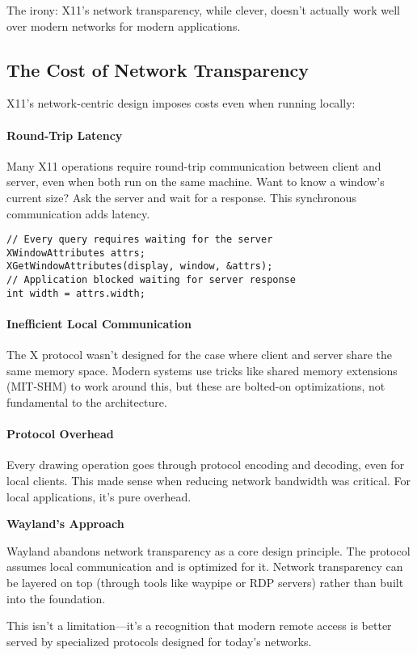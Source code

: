 The irony: X11's network transparency, while clever, doesn't actually work well over modern networks for modern applications.

\subsection{The Cost of Network Transparency}

X11's network-centric design imposes costs even when running locally:

\paragraph{Round-Trip Latency}
Many X11 operations require round-trip communication between client and server, even when both run on the same machine. Want to know a window's current size? Ask the server and wait for a response. This synchronous communication adds latency.

\begin{lstlisting}[style=cstyle, caption=X11 Round-Trip Example]
// Every query requires waiting for the server
XWindowAttributes attrs;
XGetWindowAttributes(display, window, &attrs);
// Application blocked waiting for server response
int width = attrs.width;
\end{lstlisting}

\paragraph{Inefficient Local Communication}
The X protocol wasn't designed for the case where client and server share the same memory space. Modern systems use tricks like shared memory extensions (MIT-SHM) to work around this, but these are bolted-on optimizations, not fundamental to the architecture.

\paragraph{Protocol Overhead}
Every drawing operation goes through protocol encoding and decoding, even for local clients. This made sense when reducing network bandwidth was critical. For local applications, it's pure overhead.

\begin{designbox}
\textbf{Wayland's Approach}

Wayland abandons network transparency as a core design principle. The protocol assumes local communication and is optimized for it. Network transparency can be layered on top (through tools like waypipe or RDP servers) rather than built into the foundation.

This isn't a limitation—it's a recognition that modern remote access is better served by specialized protocols designed for today's networks.
\end{designbox}

